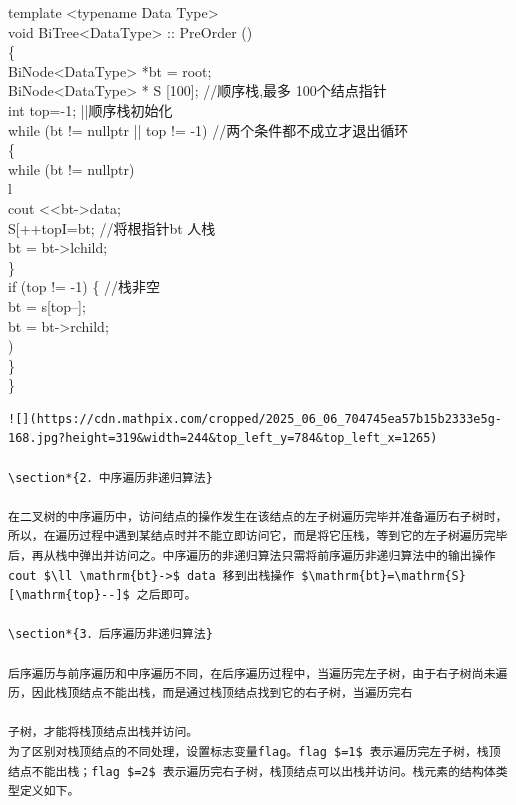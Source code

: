 \documentclass[10pt]{article}
\begin{document}
template <typename Data Type>\\
void BiTree<DataType> :: PreOrder ()\\
\{\\
BiNode<DataType> *bt = root;\\
BiNode<DataType> * S [100]; //顺序栈,最多 100个结点指针\\
int top=-1; ||顺序栈初始化\\
while (bt != nullptr || top != -1) //两个条件都不成立才退出循环\\
\{\\
while (bt != nullptr)\\
l\\
cout <<bt->data;\\
S[++topI=bt; //将根指针bt 人栈\\
bt = bt->lchild;\\
\}\\
if (top != -1) \{ //栈非空\\[0pt]
bt = s[top--];\\
bt = bt->rchild;\\
)\\
\}\\
\}

\begin{verbatim}
![](https://cdn.mathpix.com/cropped/2025_06_06_704745ea57b15b2333e5g-168.jpg?height=319&width=244&top_left_y=784&top_left_x=1265)

\section*{2．中序遍历非递归算法}

在二叉树的中序遍历中，访问结点的操作发生在该结点的左子树遍历完毕并准备遍历右子树时，所以，在遍历过程中遇到某结点时并不能立即访问它，而是将它压栈，等到它的左子树遍历完毕后，再从栈中弹出并访问之。中序遍历的非递归算法只需将前序遍历非递归算法中的输出操作 cout $\ll \mathrm{bt}->$ data 移到出栈操作 $\mathrm{bt}=\mathrm{S}[\mathrm{top}--]$ 之后即可。

\section*{3．后序遍历非递归算法}

后序遍历与前序遍历和中序遍历不同，在后序遍历过程中，当遍历完左子树，由于右子树尚未遍历，因此栈顶结点不能出栈，而是通过栈顶结点找到它的右子树，当遍历完右

子树，才能将栈顶结点出栈并访问。
为了区别对栈顶结点的不同处理，设置标志变量flag。flag $=1$ 表示遍历完左子树，栈顶结点不能出栈；flag $=2$ 表示遍历完右子树，栈顶结点可以出栈并访问。栈元素的结构体类型定义如下。
\end{verbatim}
\end{document}
